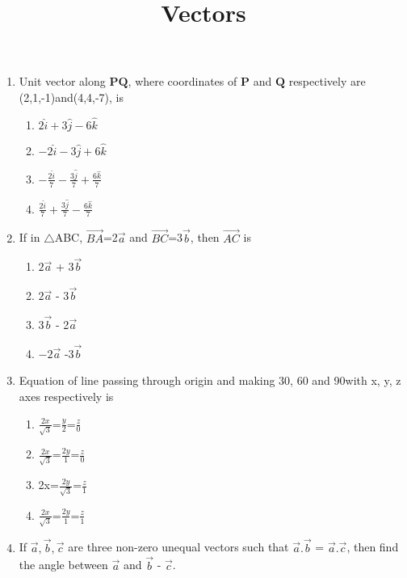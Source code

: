 \documentclass{article}
\title{\textbf{Vectors}}
\date{}
\let\vec\mathbf
\begin{document}
\maketitle

\begin{enumerate}
\item Unit vector along $\vec{PQ}$, where coordinates of $\vec{P}$ and $\vec{Q}$ respectively are (2,1,-1)and(4,4,-7), is
\begin{enumerate}
\item $2\hat{i}+3\hat{j}-6\hat{k}$
\item $-2\hat{i}-3\hat{j}+6\hat{k}$
\item $-\frac{2\hat{i}}{7}-\frac{3\hat{j}}{7}+\frac{6\hat{k}}{7}$
\item $\frac{2\hat{i}}{7}+\frac{3\hat{j}}{7}-\frac{6\hat{k}}{7}$
\end{enumerate}

\item If in $\triangle$ABC, $\overrightarrow{BA}$=2$\overrightarrow{a}$ and $\overrightarrow{BC}$=3$\overrightarrow{b}$, then $\overrightarrow{AC}$ is
\begin{enumerate}
\item $2\overrightarrow{a}$ + 3$\overrightarrow{b}$
\item $2\overrightarrow{a}$ - 3$\overrightarrow{b}$
\item $3\overrightarrow{b}$ - 2$\overrightarrow{a}$
\item $-2\overrightarrow{a}$ -3$\overrightarrow{b}$
\end{enumerate}

\item Equation of line passing through origin and making 30\degree{}, 60\degree{} and 90\degree with x, y, z axes respectively is
\begin{enumerate}
\item $\frac{2x}{\sqrt{3}}$=$\frac{y}{2}$=$\frac{z}{0}$
\item $\frac{2x}{\sqrt{3}}$=$\frac{2y}{1}$=$\frac{z}{0}$
\item 2x=$\frac{2y}{\sqrt{3}}$=$\frac{z}{1}$
\item $\frac{2x}{\sqrt{3}}$=$\frac{2y}{1}$=$\frac{z}{1}$
\end{enumerate}

\item If $\overrightarrow{a}, \overrightarrow{b}, \overrightarrow{c}$ are three non-zero unequal vectors such that $\overrightarrow{a}.\overrightarrow{b}$ = $\overrightarrow{a}.\overrightarrow{c}$, then find the angle between $\overrightarrow{a}$ and $\overrightarrow{b}$ - $\overrightarrow{c}$.



\end{enumerate}
\end{document}
